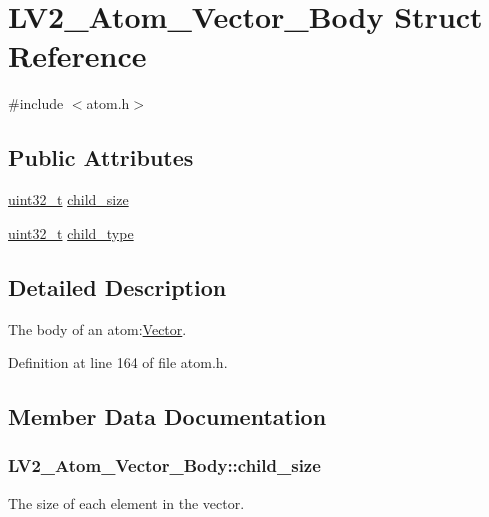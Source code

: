 \hypertarget{struct_l_v2___atom___vector___body}{}\section{L\+V2\+\_\+\+Atom\+\_\+\+Vector\+\_\+\+Body Struct Reference}
\label{struct_l_v2___atom___vector___body}


{\ttfamily \#include $<$atom.\+h$>$}

\subsection*{Public Attributes}
\begin{DoxyCompactItemize}
\item 
\hyperlink{lib-src_2ffmpeg_2win32_2stdint_8h_a6eb1e68cc391dd753bc8ce896dbb8315}{uint32\+\_\+t} \hyperlink{struct_l_v2___atom___vector___body_abb27770ffe229ac0aca5bc98383de578}{child\+\_\+size}
\item 
\hyperlink{lib-src_2ffmpeg_2win32_2stdint_8h_a6eb1e68cc391dd753bc8ce896dbb8315}{uint32\+\_\+t} \hyperlink{struct_l_v2___atom___vector___body_a934cee86cacc8555bc60e1e9adeae4a9}{child\+\_\+type}
\end{DoxyCompactItemize}


\subsection{Detailed Description}
The body of an atom\+:\hyperlink{class_vector}{Vector}. 

Definition at line 164 of file atom.\+h.



\subsection{Member Data Documentation}
\subsubsection[{\texorpdfstring{child\+\_\+size}{child_size}}]{ L\+V2\+\_\+\+Atom\+\_\+\+Vector\+\_\+\+Body\+::child\+\_\+size}\hypertarget{struct_l_v2___atom___vector___body_abb27770ffe229ac0aca5bc98383de578}{}\label{struct_l_v2___atom___vector___body_abb27770ffe229ac0aca5bc98383de578}
The size of each element in the vector. 

